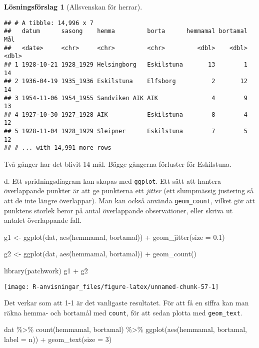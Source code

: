 \documentclass[
]{book}
\newenvironment{Shaded}{\begin{snugshade}}{\end{snugshade}}
\newcommand{\AttributeTok}[1]{\textcolor[rgb]{0.77,0.63,0.00}{#1}}
\newcommand{\DecValTok}[1]{\textcolor[rgb]{0.00,0.00,0.81}{#1}}
\newcommand{\FloatTok}[1]{\textcolor[rgb]{0.00,0.00,0.81}{#1}}
\newcommand{\FunctionTok}[1]{\textcolor[rgb]{0.00,0.00,0.00}{#1}}
\newcommand{\NormalTok}[1]{#1}
\newcommand{\OtherTok}[1]{\textcolor[rgb]{0.56,0.35,0.01}{#1}}
\newcommand{\SpecialCharTok}[1]{\textcolor[rgb]{0.00,0.00,0.00}{#1}}
\theoremstyle{definition}
\theoremstyle{definition}
\theoremstyle{definition}
\theoremstyle{definition}
\newtheorem{hypothesis}{Lösningsförslag}[chapter]
\theoremstyle{remark}
\begin{document}
\begin{hypothesis}[Allsvenskan för herrar]
\begin{verbatim}
## # A tibble: 14,996 x 7
##   datum      sasong    hemma         borta      hemmamal bortamal   Mål
##   <date>     <chr>     <chr>         <chr>         <dbl>    <dbl> <dbl>
## 1 1928-10-21 1928_1929 Helsingborg   Eskilstuna       13        1    14
## 2 1936-04-19 1935_1936 Eskilstuna    Elfsborg          2       12    14
## 3 1954-11-06 1954_1955 Sandviken AIK AIK               4        9    13
## 4 1927-10-30 1927_1928 AIK           Eskilstuna        8        4    12
## 5 1928-11-04 1928_1929 Sleipner      Eskilstuna        7        5    12
## # ... with 14,991 more rows
\end{verbatim}

Två gånger har det blivit 14 mål. Bägge gångerna förluster för Eskilstuna.

d. Ett spridningsdiagram kan skapas med \texttt{ggplot}. Ett sätt att hantera överlappande punkter är att ge punkterna ett \emph{jitter} (ett slumpmässig justering så att de inte längre överlappar). Man kan också använda \texttt{geom\_count}, vilket gör att punktens storlek beror på antal överlappande observationer, eller skriva ut antalet överlappande fall.

\begin{Shaded}
\begin{Highlighting}[]
\NormalTok{g1 }\OtherTok{\textless{}{-}} \FunctionTok{ggplot}\NormalTok{(dat, }\FunctionTok{aes}\NormalTok{(hemmamal, bortamal)) }\SpecialCharTok{+}
  \FunctionTok{geom\_jitter}\NormalTok{(}\AttributeTok{size =} \FloatTok{0.1}\NormalTok{)}

\NormalTok{g2 }\OtherTok{\textless{}{-}} \FunctionTok{ggplot}\NormalTok{(dat, }\FunctionTok{aes}\NormalTok{(hemmamal, bortamal)) }\SpecialCharTok{+}
  \FunctionTok{geom\_count}\NormalTok{()}

\FunctionTok{library}\NormalTok{(patchwork)}
\NormalTok{g1 }\SpecialCharTok{+}\NormalTok{ g2}
\end{Highlighting}
\end{Shaded}

\begin{center}\texttt{[image: R-anvisningar\_files/figure-latex/unnamed-chunk-57-1]} \end{center}

Det verkar som att 1-1 är det vanligaste resultatet. För att få en siffra kan man räkna hemma- och bortamål med \texttt{count}, för att sedan plotta med \texttt{geom\_text}.

\begin{Shaded}
\begin{Highlighting}[]
\NormalTok{dat }\SpecialCharTok{\%\textgreater{}\%} 
  \FunctionTok{count}\NormalTok{(hemmamal, bortamal) }\SpecialCharTok{\%\textgreater{}\%} 
  \FunctionTok{ggplot}\NormalTok{(}\FunctionTok{aes}\NormalTok{(hemmamal, bortamal, }\AttributeTok{label =}\NormalTok{ n)) }\SpecialCharTok{+}
  \FunctionTok{geom\_text}\NormalTok{(}\AttributeTok{size =} \DecValTok{3}\NormalTok{)}
\end{Highlighting}
\end{Shaded}


\end{hypothesis}
\end{document}
